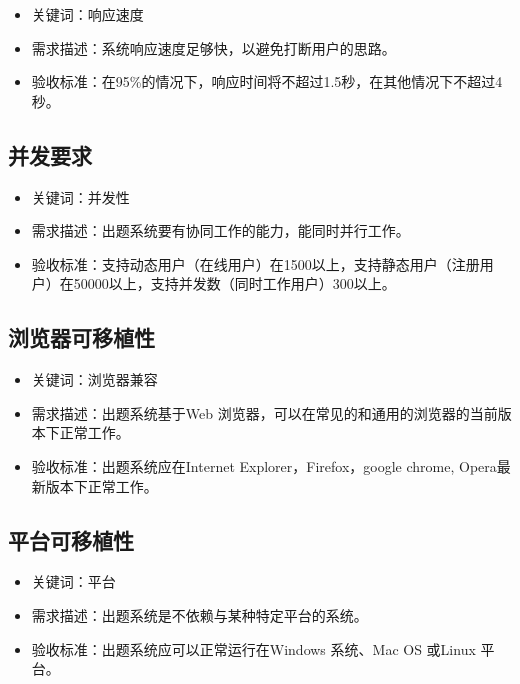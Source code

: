 \documentclass[hyperref, a4paper]{ctexart}
\providecommand{\tightlist}{%
  \setlength{\itemsep}{0pt}\setlength{\parskip}{0pt}}
\begin{document}
\begin{itemize}
\tightlist
\item
  关键词：响应速度
\item
  需求描述：系统响应速度足够快，以避免打断用户的思路。
\item
  验收标准：在95\%的情况下，响应时间将不超过1.5秒，在其他情况下不超过4秒。
\end{itemize}

\hypertarget{ux5e76ux53d1ux8981ux6c42}{%
\subsection{并发要求}\label{ux5e76ux53d1ux8981ux6c42}}

\begin{itemize}
\tightlist
\item
  关键词：并发性
\item
  需求描述：出题系统要有协同工作的能力，能同时并行工作。
\item
  验收标准：支持动态用户（在线用户）在1500以上，支持静态用户（注册用户）在50000以上，支持并发数（同时工作用户）300以上。
\end{itemize}

\hypertarget{ux6d4fux89c8ux5668ux53efux79fbux690dux6027}{%
\subsection{浏览器可移植性}\label{ux6d4fux89c8ux5668ux53efux79fbux690dux6027}}

\begin{itemize}
\tightlist
\item
  关键词：浏览器兼容
\item
  需求描述：出题系统基于Web
  浏览器，可以在常见的和通用的浏览器的当前版本下正常工作。
\item
  验收标准：出题系统应在Internet Explorer，Firefox，google chrome,
  Opera最新版本下正常工作。
\end{itemize}

\hypertarget{ux5e73ux53f0ux53efux79fbux690dux6027}{%
\subsection{平台可移植性}\label{ux5e73ux53f0ux53efux79fbux690dux6027}}

\begin{itemize}
\tightlist
\item
  关键词：平台
\item
  需求描述：出题系统是不依赖与某种特定平台的系统。
\item
  验收标准：出题系统应可以正常运行在Windows 系统、Mac OS 或Linux 平台。
\end{itemize}
\end{document}
